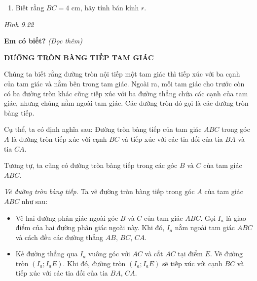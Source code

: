 \begin{lesson}
\begin{enumerate}[label=\alph*)]
        \answerline
        \item Biết rằng $BC=4$ cm, hãy tính bán kính $r$.

        \answerline
        \answerline
    \end{enumerate}

    \begin{center}

    \textit{Hình 9.22}
    \end{center}

    \textbf{Em có biết?} \textit{(Đọc thêm)}

    \textbf{ĐƯỜNG TRÒN BÀNG TIẾP TAM GIÁC}

    Chúng ta biết rằng đường tròn nội tiếp một tam giác thì tiếp xúc với ba cạnh của tam giác và nằm bên trong tam giác. Ngoài ra, mỗi tam giác cho trước còn có ba đường tròn khác cũng tiếp xúc với ba đường thẳng chứa các cạnh của tam giác, nhưng chúng nằm ngoài tam giác. Các đường tròn đó gọi là các đường tròn bàng tiếp.

    Cụ thể, ta có định nghĩa sau: Đường tròn bàng tiếp của tam giác $ABC$ trong góc $A$ là đường tròn tiếp xúc với cạnh $BC$ và tiếp xúc với các tia đối của tia $BA$ và tia $CA$.

    Tương tự, ta cũng có đường tròn bàng tiếp trong các góc $B$ và $C$ của tam giác $ABC$.

    \textit{Vẽ đường tròn bàng tiếp.} Ta vẽ đường tròn bàng tiếp trong góc $A$ của tam giác $ABC$ như sau:
    \begin{itemize}
        \item Vẽ hai đường phân giác ngoài góc $B$ và $C$ của tam giác $ABC$. Gọi $I_a$ là giao điểm của hai đường phân giác ngoài này. Khi đó, $I_a$ nằm ngoài tam giác $ABC$ và cách đều các đường thẳng $AB$, $BC$, $CA$.
        \item Kẻ đường thẳng qua $I_a$ vuông góc với $AC$ và cắt $AC$ tại điểm $E$. Vẽ đường tròn $(I_a;I_aE)$. Khi đó, đường tròn $(I_a;I_aE)$ sẽ tiếp xúc với cạnh $BC$ và tiếp xúc với các tia đối của tia $BA$, $CA$.
    \end{itemize}


\end{lesson}
